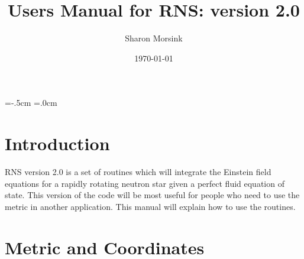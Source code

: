 \topmargin=-.5cm
\textheight=22cm
\oddsidemargin=.0cm
\textwidth=15.8cm
\baselineskip=18pt
\def\be{\begin{equation}}
\def\ee{\end{equation}}
\def\<{\noindent }



\title{\bf Users Manual for RNS: version 2.0}
\author{Sharon Morsink}
\date{\today}
\maketitle

\section{Introduction}

RNS version 2.0 is a set of routines which will integrate the 
Einstein field equations for a rapidly rotating neutron star
given a perfect fluid equation of state. This version of the code
will be most useful for people who need to use the metric in another 
application. This manual will explain how to use the routines. 

\section{Metric and Coordinates}

